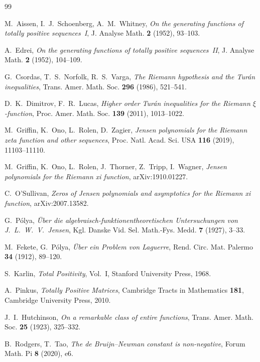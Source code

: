 \documentclass[11pt]{amsart}
\theoremstyle{definition}
\theoremstyle{remark}
\begin{document}
\begin{thebibliography}{99}

 M.~Aissen, I.~J.~Schoenberg, A.~M.~Whitney,
\emph{On the generating functions of totally positive sequences~I},
J. Analyse Math. \textbf{2} (1952), 93--103.

 A.~Edrei,
\emph{On the generating functions of totally positive sequences~II},
J. Analyse Math. \textbf{2} (1952), 104--109.

 G.~Csordas, T.~S.~Norfolk, R.~S.~Varga,
\emph{The Riemann hypothesis and the Tur\'an inequalities},
Trans. Amer. Math. Soc. \textbf{296} (1986), 521--541.

 D.~K.~Dimitrov, F.~R.~Lucas,
\emph{Higher order Tur\'an inequalities for the Riemann $\xi$-function},
Proc. Amer. Math. Soc. \textbf{139} (2011), 1013--1022.

 M.~Griffin, K.~Ono, L.~Rolen, D.~Zagier,
\emph{Jensen polynomials for the Riemann zeta function and other
sequences}, Proc. Natl. Acad. Sci. USA \textbf{116} (2019),
11103--11110.

 M.~Griffin, K.~Ono, L.~Rolen, J.~Thorner, Z.~Tripp,
I.~Wagner, \emph{Jensen polynomials for the Riemann xi function},
arXiv:1910.01227.

 C.~O'Sullivan,
\emph{Zeros of Jensen polynomials and asymptotics for the Riemann xi
function}, arXiv:2007.13582.

 G.~P\'olya,
\emph{\"Uber die algebraisch-funktionentheoretischen Untersuchungen von
J.~L.~W.~V.~Jensen}, Kgl. Danske Vid. Sel. Math.-Fys. Medd. \textbf{7}
(1927), 3--33.

 M.~Fekete, G.~P\'olya,
\emph{\"Uber ein Problem von Laguerre},
Rend. Circ. Mat. Palermo \textbf{34} (1912), 89--120.

 S.~Karlin, \emph{Total Positivity}, Vol.~I,
Stanford University Press, 1968.

 A.~Pinkus, \emph{Totally Positive Matrices},
Cambridge Tracts in Mathematics \textbf{181}, Cambridge University
Press, 2010.

 J.~I.~Hutchinson,
\emph{On a remarkable class of entire functions},
Trans. Amer. Math. Soc. \textbf{25} (1923), 325--332.

 B.~Rodgers, T.~Tao,
\emph{The de Bruijn--Newman constant is non-negative},
Forum Math. Pi \textbf{8} (2020), e6.


\end{thebibliography}
\end{document}
